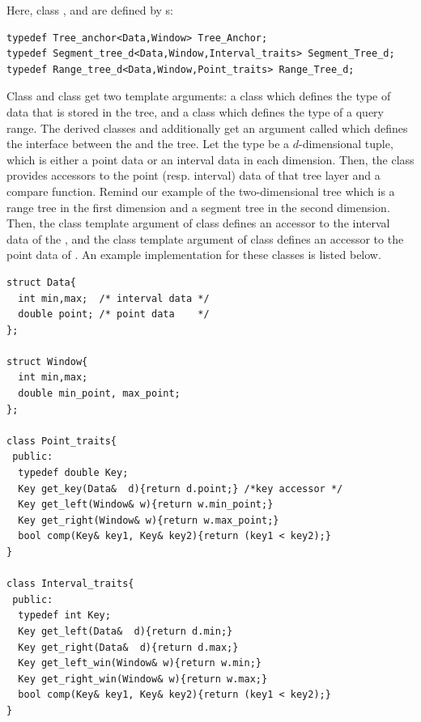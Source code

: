 Here, class , and
 are defined by s:

\begin{verbatim}
typedef Tree_anchor<Data,Window> Tree_Anchor;
typedef Segment_tree_d<Data,Window,Interval_traits> Segment_Tree_d;
typedef Range_tree_d<Data,Window,Point_traits> Range_Tree_d;
\end{verbatim}







Class  and class
 get  two template arguments: a class
 which defines the type of data that is stored in
the tree, and a class  which defines the type of a query
range.
The derived classes  and 
additionally get an argument called
 which defines the interface between the
 and the tree. Let the  type be a $d$-dimensional
tuple, which is either a point data or an interval data in each
dimension. Then, the class  provides accessors to
the point (resp. interval) data of that tree layer and a compare
function. Remind our example of the two-dimensional tree which
is a range tree in  the first dimension and
a segment tree  in the second dimension. Then, the
 class template argument of class
 defines an accessor to the interval data of
the , and the
 class template argument of class
 defines an accessor to the point data of
.
An example implementation for these classes is listed below.

\begin{verbatim}
struct Data{
  int min,max;  /* interval data */
  double point; /* point data    */
};
 
struct Window{
  int min,max;
  double min_point, max_point;
};

class Point_traits{
 public:
  typedef double Key;
  Key get_key(Data&  d){return d.point;} /*key accessor */
  Key get_left(Window& w){return w.min_point;}
  Key get_right(Window& w){return w.max_point;}
  bool comp(Key& key1, Key& key2){return (key1 < key2);} 
}

class Interval_traits{
 public:
  typedef int Key;
  Key get_left(Data&  d){return d.min;}
  Key get_right(Data&  d){return d.max;}
  Key get_left_win(Window& w){return w.min;}
  Key get_right_win(Window& w){return w.max;}
  bool comp(Key& key1, Key& key2){return (key1 < key2);} 
}
\end{verbatim}


